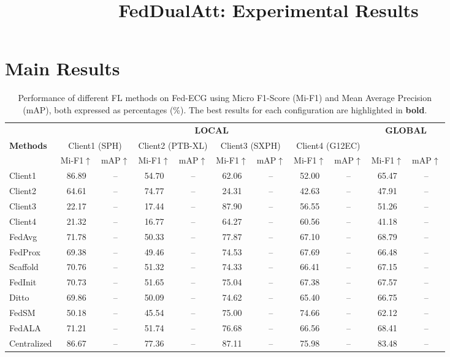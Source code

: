 \documentclass[11pt]{article}
\begin{document}
\title{FedDualAtt: Experimental Results}
\author{}
\date{}
\maketitle

\section{Main Results}

\begin{table}[h!]
\centering
\caption{Performance of different FL methods on Fed-ECG using Micro F1-Score (Mi-F1) and Mean Average Precision (mAP), both expressed as percentages (\%). The best results for each configuration are highlighted in \textbf{bold}.}
\label{tab:main_results}
\small
\begin{tabular}{l|cc|cc|cc|cc|cc}
\toprule
 & \multicolumn{8}{c|}{\textbf{LOCAL}} & \multicolumn{2}{c}{\textbf{GLOBAL}} \\
\cmidrule{2-11}
\textbf{Methods} & \multicolumn{2}{c|}{Client1 (SPH)} & \multicolumn{2}{c|}{Client2 (PTB-XL)} & \multicolumn{2}{c|}{Client3 (SXPH)} & \multicolumn{2}{c|}{Client4 (G12EC)} & \multicolumn{2}{c}{} \\
 & Mi-F1$\uparrow$ & mAP$\uparrow$ & Mi-F1$\uparrow$ & mAP$\uparrow$ & Mi-F1$\uparrow$ & mAP$\uparrow$ & Mi-F1$\uparrow$ & mAP$\uparrow$ & Mi-F1$\uparrow$ & mAP$\uparrow$ \\
\midrule
Client1 & 86.89 & -- & 54.70 & -- & 62.06 & -- & 52.00 & -- & 65.47 & -- \\
Client2 & 64.61 & -- & 74.77 & -- & 24.31 & -- & 42.63 & -- & 47.91 & -- \\
Client3 & 22.17 & -- & 17.44 & -- & 87.90 & -- & 56.55 & -- & 51.26 & -- \\
Client4 & 21.32 & -- & 16.77 & -- & 64.27 & -- & 60.56 & -- & 41.18 & -- \\
\midrule
FedAvg & 71.78 & -- & 50.33 & -- & 77.87 & -- & 67.10 & -- & 68.79 & -- \\
FedProx & 69.38 & -- & 49.46 & -- & 74.53 & -- & 67.69 & -- & 66.48 & -- \\
Scaffold & 70.76 & -- & 51.32 & -- & 74.33 & -- & 66.41 & -- & 67.15 & -- \\
FedInit & 70.73 & -- & 51.65 & -- & 75.04 & -- & 67.38 & -- & 67.57 & -- \\
Ditto & 69.86 & -- & 50.09 & -- & 74.62 & -- & 65.40 & -- & 66.75 & -- \\
FedSM & 50.18 & -- & 45.54 & -- & 75.00 & -- & 74.66 & -- & 62.12 & -- \\
FedALA & 71.21 & -- & 51.74 & -- & 76.68 & -- & 66.56 & -- & 68.41 & -- \\
\midrule
Centralized & 86.67 & -- & 77.36 & -- & 87.11 & -- & 75.98 & -- & 83.48 & -- \\
\bottomrule
\end{tabular}
\end{table}
\end{document}
